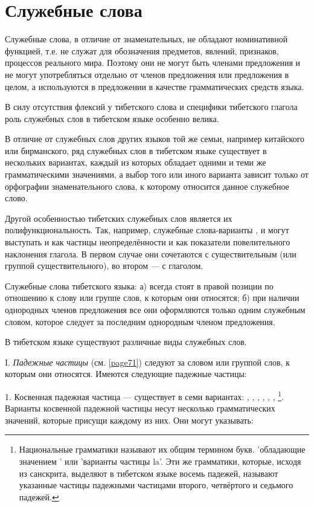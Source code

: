 \section{Служебные слова}

Служебные слова, в отличие от знаменательных, не обладают номинативной функцией, т.е. не служат для обозначения предметов, явлений, признаков, процессов реального мира. Поэтому они не могут быть членами предложения и не могут употребляться отдельно от членов предложения или предложения в целом, а используются в предложении в качестве грамматических средств языка.

В силу отсутствия флексий у тибетского слова и специфики тибетского глагола роль служебных слов в тибетском языке особенно велика.

В отличие от служебных слов других языков той же семьи, например китайского или бирманского, ряд служебных слов в тибетском языке существует в нескольких вариантах, каждый из которых обладает одними и теми же грамматическими значениями, а выбор того или иного варианта зависит только от орфографии знаменательного слова, к которому относится данное служебное слово.

Другой особенностью тибетских служебных слов является их полифункциональность. Так, например, служебные слова-варианты ,  и  могут выступать и как частицы неопределённости и как показатели повелительного наклонения глагола. В первом случае они сочетаются с существительным (или группой существительного), во втором --- с глаголом.

Служебные слова тибетского языка: а) всегда стоят в правой позиции по отношению к слову или группе слов, к которым они относятся; б) при наличии однородных членов предложения все они оформляются только одним служебным словом, которое следует за последним однородным членом предложения.

В тибетском языке существуют различные виды служебных слов.

I. \emph{Падежные частицы} (см. \ref{page71}) следуют за словом или группой слов, к которым они относятся. Имеются следующие падежные частицы:

1. Косвенная падежная частица --- существует в семи
вариантах: , , , , , , \footnote[40]{Национальные грамматики называют их общим термином  букв. 'обладающие значением ' или 'варианты частицы la'. Эти же грамматики, которые, исходя из санскрита, выделяют в тибетском языке восемь падежей, называют указанные частицы падежными частицами второго, четвёртого и седьмого падежей.}.	
Варианты косвенной падежной частицы несут несколько грамматических значений, которые присущи каждому из них. Они могут указывать:

